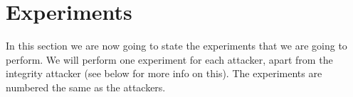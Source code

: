 

\section{Experiments}
\label{methodology_experiments}
\iffalse
For each experiment
\begin{itemize}
    \item Give the experiment a number (e.g. E1)
    \item What do we want to test
    \item How (including attackers)
    \item With what (algorithms for test and attacker algorithm)
    \item Expectations
    \item How should be evaluated
\end{itemize}
$\Rightarrow$ Outcome and expectation validation in validation chapter later
\fi

In this section we are now going to state the experiments that we are going to perform. We will perform one experiment for each attacker, apart from the integrity attacker (see below for more info on this). The experiments are numbered the same as the attackers.

